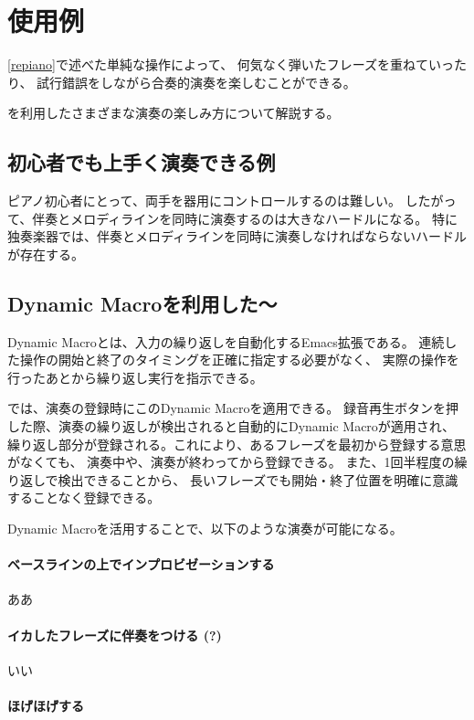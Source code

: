 \section{{\system}使用例}

\ref{repiano}で述べた単純な操作によって、
何気なく弾いたフレーズを重ねていったり、
試行錯誤をしながら合奏的演奏を楽しむことができる。

{\system}を利用したさまざまな演奏の楽しみ方について解説する。


\subsection{初心者でも上手く演奏できる例}
ピアノ初心者にとって、両手を器用にコントロールするのは難しい。
したがって、伴奏とメロディラインを同時に演奏するのは大きなハードルになる。
特に独奏楽器では、伴奏とメロディラインを同時に演奏しなければならないハードルが存在する。



\subsection{Dynamic Macroを利用した〜}
Dynamic Macroとは、入力の繰り返しを自動化するEmacs拡張である。
連続した操作の開始と終了のタイミングを正確に指定する必要がなく、
実際の操作を行ったあとから繰り返し実行を指示できる。

{\system}では、演奏の登録時にこのDynamic Macroを適用できる。
録音再生ボタンを押した際、演奏の繰り返しが検出されると自動的にDynamic Macroが適用され、
繰り返し部分が登録される。これにより、あるフレーズを最初から登録する意思がなくても、
演奏中や、演奏が終わってから登録できる。
また、1回半程度の繰り返しで検出できることから、
長いフレーズでも開始・終了位置を明確に意識することなく登録できる。

Dynamic Macroを活用することで、以下のような演奏が可能になる。

\paragraph*{ベースラインの上でインプロビゼーションする}
ああ
\paragraph*{イカしたフレーズに伴奏をつける (?)}
いい
\paragraph*{ほげほげする}
